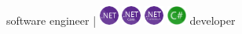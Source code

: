\documentclass[]{friggeri-cvRS}
\begin{document}
       {software engineer | \includegraphics[height=18pt]{images/net.png} \includegraphics[height=18pt]{images/netcore.png} \includegraphics[height=18pt]{images/netframework.png} \includegraphics[height=18pt]{images/CSharp.png} developer}

\end{document}
